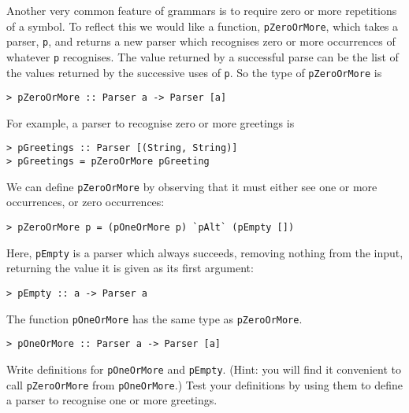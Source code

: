 Another very common feature of grammars is to require zero or more
repetitions of a symbol.  To reflect this we would like a function,
\mbox{\tt pZeroOrMore}, which
takes a parser, \mbox{\tt p}, and returns a new parser which recognises zero or
more occurrences of whatever \mbox{\tt p} recognises.  The value returned by a successful
parse can be the list of the values returned by the successive uses
of \mbox{\tt p}.  So the type of \mbox{\tt pZeroOrMore} is
\begin{verbatim}
> pZeroOrMore :: Parser a -> Parser [a]
\end{verbatim}
%
For example, a parser to recognise zero or more greetings is
\begin{verbatim}
> pGreetings :: Parser [(String, String)]
> pGreetings = pZeroOrMore pGreeting
\end{verbatim}
%
%
We can define \mbox{\tt pZeroOrMore} by observing that it must either see one or more
occurrences, or zero occurrences:
\begin{verbatim}
> pZeroOrMore p = (pOneOrMore p) `pAlt` (pEmpty [])
\end{verbatim}
%
Here, \mbox{\tt pEmpty} is a parser which always succeeds, removing nothing from the
input, returning the value it is given as its first argument:
\begin{verbatim}
> pEmpty :: a -> Parser a
\end{verbatim}
%
\par
The function \mbox{\tt pOneOrMore} has the same type as \mbox{\tt pZeroOrMore}.
\begin{verbatim}
> pOneOrMore :: Parser a -> Parser [a]
\end{verbatim}
%
\begin{exercise}
\label{ex:pEmpty}
Write definitions for \mbox{\tt pOneOrMore} and \mbox{\tt pEmpty}.  (Hint: you will find it
convenient to call \mbox{\tt pZeroOrMore} from \mbox{\tt pOneOrMore}.)  Test your definitions
by using them to define a parser to recognise one or more greetings.
\end{exercise}

